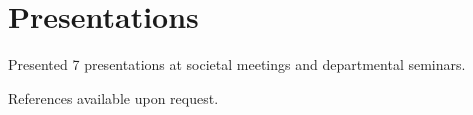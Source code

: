 \documentclass[10pt,letterpaper,sans]{modernresume} %
\begin{document}
\section{Presentations}

Presented 7 presentations at societal meetings and departmental seminars. 

\vspace{6pt}

References available upon request.











\end{document}
